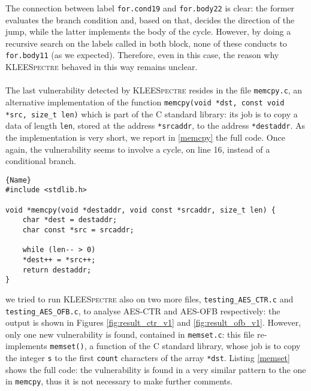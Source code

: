 \documentclass[12pt,a4paper]{book}
\theoremstyle{definition}
\begin{document}
	The connection between label \texttt{for.cond19} and \texttt{for.body22} is clear: the former evaluates the branch condition and, based on that, decides the direction of the jump, while the latter implements the body of the cycle. However, by doing a recursive search on the labels called in both block, none of these conducts to \texttt{for.body11} (as we expected). Therefore, even in this case, the reason why \textsc{KLEESpectre} behaved in this way remains unclear.
	\paragraph{}The last vulnerability detected by \textsc{KLEESpectre} resides in the file \texttt{memcpy.c}, an alternative implementation of the function \texttt{memcpy(void *dst, const void *src, size\_t len)} which is part of the C standard library: its job is to copy a data of length \texttt{len}, stored at the address \texttt{*srcaddr}, to the address \texttt{*destaddr}. As the implementation is very short, we report in \ref{memcpy} the full code. Once again, the vulnerability seems to involve a cycle, on line 16, instead of a conditional branch.
	
	\lstset{
		numbers=left
	}
	\begin{minipage}{.9\textwidth}
		\begin{lstlisting}[caption=\texttt{memcpy.c}, firstnumber=10, label=memcpy]{Name}
#include <stdlib.h>

void *memcpy(void *destaddr, void const *srcaddr, size_t len) {
	char *dest = destaddr;
	char const *src = srcaddr;
	
	while (len-- > 0)
	*dest++ = *src++;
	return destaddr;
}
		\end{lstlisting}
	\end{minipage}	
	\vspace{3mm}
	
	we tried to run \textsc{KLEESpectre} also on two more files, \texttt{testing\_AES\_CTR.c} and \texttt{testing\_AES\_OFB.c}, to analyse AES-CTR and AES-OFB respectively: the output is shown in Figures \ref{fig:result_ctr_v1} and \ref{fig:result_ofb_v1}. However, only one new vulnerability is found, contained in \texttt{memset.c}: this file re-implements \texttt{memset()}, a function of the C standard library, whose job is to copy the integer \texttt{s} to the first \texttt{count} characters of the array \texttt{*dst}. Listing \ref{memset} shows the full code: the vulnerability is found in a very similar pattern to the one in \texttt{memcpy}, thus it is not necessary to make further comments.
	
\end{document}
